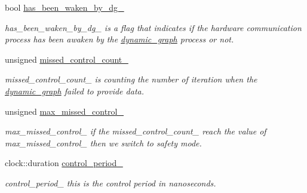 \begin{DoxyCompactItemize}
bool \hyperlink{classdynamic__graph_1_1DynamicGraphManager_a7e6cc5e58f1accce947f929d233a67fd}{has\+\_\+been\+\_\+waken\+\_\+by\+\_\+dg\+\_\+}
\begin{DoxyCompactList}\small\item\em has\+\_\+been\+\_\+waken\+\_\+by\+\_\+dg\+\_\+ is a flag that indicates if the hardware communication process has been awaken by the \hyperlink{namespacedynamic__graph}{dynamic\+\_\+graph} process or not. \end{DoxyCompactList}\item 
\mbox{\label{classdynamic__graph_1_1DynamicGraphManager_abafc3cf4d8f7dc938f98b7eb07b7af9a}} 
unsigned \hyperlink{classdynamic__graph_1_1DynamicGraphManager_abafc3cf4d8f7dc938f98b7eb07b7af9a}{missed\+\_\+control\+\_\+count\+\_\+}
\begin{DoxyCompactList}\small\item\em missed\+\_\+control\+\_\+count\+\_\+ is counting the number of iteration when the \hyperlink{namespacedynamic__graph}{dynamic\+\_\+graph} failed to provide data. \end{DoxyCompactList}\item 
\mbox{\label{classdynamic__graph_1_1DynamicGraphManager_a10922e790e039f78b0fabbb5ef944488}} 
unsigned \hyperlink{classdynamic__graph_1_1DynamicGraphManager_a10922e790e039f78b0fabbb5ef944488}{max\+\_\+missed\+\_\+control\+\_\+}
\begin{DoxyCompactList}\small\item\em max\+\_\+missed\+\_\+control\+\_\+ if the missed\+\_\+control\+\_\+count\+\_\+ reach the value of max\+\_\+missed\+\_\+control\+\_\+ then we switch to safety mode. \end{DoxyCompactList}\item 
\mbox{\label{classdynamic__graph_1_1DynamicGraphManager_a1006cdb2d7e30e291d3d568923ebbc03}} 
clock\+::duration \hyperlink{classdynamic__graph_1_1DynamicGraphManager_a1006cdb2d7e30e291d3d568923ebbc03}{control\+\_\+period\+\_\+}
\begin{DoxyCompactList}\small\item\em control\+\_\+period\+\_\+ this is the control period in nanoseconds. \end{DoxyCompactList}\item 
\mbox{\label{classdynamic__graph_1_1DynamicGraphManager_a26167d2936575dfdbe31be4717b70cc5}} 

\end{DoxyCompactItemize}
